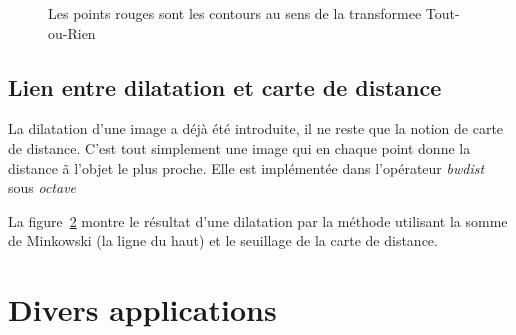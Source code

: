 \documentclass[10pt,a4paper]{article}
\begin{document}
{\begin{figure}[h]
\hspace{-0.0\textwidth}\scalebox{0.66}{}
\vspace{-10mm}
	\caption{Les points rouges sont les contours au sens de la transformee Tout-ou-Rien}
	\label{contour}
\end{figure}

\clearpage

\subsection{Lien entre dilatation et carte de distance}
La dilatation d'une image a d\'{e}j\`{a} \'{e}t\'{e} introduite, il ne reste que la notion de carte de distance. C'est tout simplement une image qui en chaque point donne la distance \~{a} l'objet le plus proche. Elle est impl\'{e}ment\'{e}e dans l'op\'{e}rateur \textit{bwdist} sous \textit{octave}

La figure~\ref{distanceAndDilatation} montre le r\'{e}sultat d'une dilatation par la m\'{e}thode utilisant la somme de Minkowski (la ligne du haut) et le seuillage de la carte de distance.

\begin{figure}[h]
\hspace{-0.0\textwidth}\scalebox{0.66}{}
\vspace{-10mm}
	\caption{}
	\label{distanceAndDilatation}
\end{figure}













\section{Divers applications}

}
\end{document}

